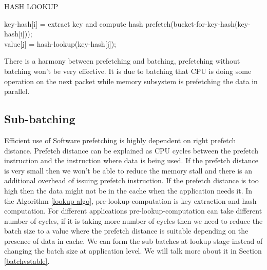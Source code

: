 \begin{algorithm}[H]
 \caption{HASH LOOKUP}
 \label{lookup-algo}
 \begin{algorithmic}[1]
     \State key-hash[i] = extract key and compute hash
     \State prefetch(bucket-for-key-hash(key-hash[i]));
 \EndFor
 \\
     \State value[j] = hash-lookup(key-hash[j]);
 \EndFor
 \end{algorithmic}
\end{algorithm}
There is a harmony between prefetching and batching, prefetching without batching won't be very effective. It is due to batching that CPU is doing some operation on the next packet while memory subsystem is prefetching the data in parallel.

\subsection{Sub-batching}
\label{subbatching}
Efficient use of Software prefetching is highly dependent on right prefetch distance.  Prefetch distance can be explained as CPU cycles between the prefetch instruction and the instruction where data is being used. If the prefetch distance is very small then we won't be able to reduce the memory stall and there is an additional overhead of issuing prefetch instruction. If the prefetch distance is too high then the data might not be in the cache when the application needs it. In the Algorithm \ref{lookup-algo}, pre-lookup-computation is key extraction and hash computation. For different applications pre-lookup-computation can take different number of cycles, if it is taking more number of cycles then we need to reduce the batch size to a value where the prefetch distance is suitable depending on the presence of data in cache. We can form the sub batches at lookup stage instead of changing the batch size at application level. We will talk more about it in Section \ref{batchvstable}.

